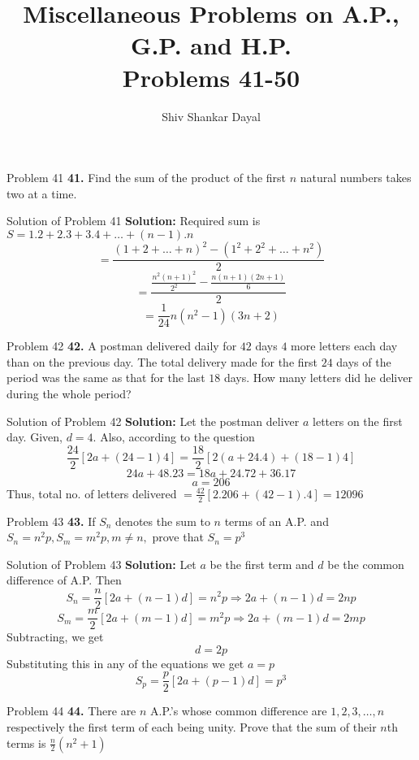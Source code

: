\documentclass[aspectratio=1610,8pt]{beamer}
\title{Miscellaneous Problems on A.P., G.P. and H.P.\\Problems 41-50}
\author[Shiv Shankar Dayal]{Shiv Shankar Dayal}
\begin{document}
\begin{frame}
  \titlepage
\end{frame}
\begin{frame}{Problem 41}
  \textbf{41.} Find the sum of the  product of the first $n$ natural numbers takes two at a time.
\end{frame}
\begin{frame}{Solution of Problem 41}
  \textbf{Solution:} Required sum is $S = 1.2 + 2.3 + 3.4 + \ldots + (n - 1).n$
  $$= \frac{(1 + 2 + \ldots + n)^2 - (1^2 + 2^2 + \ldots + n^2)}{2}$$
  $$ = \frac{\frac{n^2(n + 1)^2}{2^2} - \frac{n(n + 1)(2n + 1)}{6}}{2}$$
  $$= \frac{1}{24}n(n^2 - 1)(3n + 2)$$
\end{frame}
\begin{frame}{Problem 42}
  \textbf{42.} A postman delivered daily for $42$ days $4$ more letters each day than on the previous day. The total delivery made
  for the first $24$ days of the period was the same as that for the last $18$ days. How many letters did he deliver during the
  whole period?
\end{frame}
\begin{frame}{Solution of Problem 42}
  \textbf{Solution:} Let the postman deliver $a$ letters on the first day. Given, $d = 4.$ Also, according to the question
  $$\frac{24}{2}[2a + (24 - 1)4] = \frac{18}{2}[2(a + 24.4) + (18 - 1)4]$$
  $$24a + 48.23 = 18a + 24.72 + 36.17$$
  $$a = 206$$
  Thus, total no. of letters delivered $= \frac{42}{2}[2.206 + (42 - 1).4] = 12096$
\end{frame}
\begin{frame}{Problem 43}
  \textbf{43.} If $S_n$ denotes the sum to $n$ terms of an A.P. and $S_n = n^2p, S_m = m^2p, m\neq n,$ prove that $S_n = p^3$
\end{frame}
\begin{frame}{Solution of Problem 43}
  \textbf{Solution:} Let $a$ be the first term and $d$ be the common difference of A.P. Then
  $$S_n = \frac{n}{2}[2a + (n - 1)d] = n^2p\Rightarrow 2a + (n - 1)d = 2np$$
  $$S_m = \frac{m}{2}[2a + (m - 1)d] = m^2p\Rightarrow 2a + (m - 1)d = 2mp$$
  Subtracting, we get
  $$d = 2p$$
  Substituting this in any of the equations we get $a = p$
  $$S_p = \frac{p}{2}[2a + (p - 1)d] = p^3$$
\end{frame}
\begin{frame}{Problem 44}
  \textbf{44.} There are $n$ A.P.'s whose common difference are $1, 2, 3, \ldots, n$ respectively the first term of each being
  unity. Prove that the sum of their $n$th terms is $\frac{n}{2}(n^2 + 1)$
\end{frame}
\end{document}
